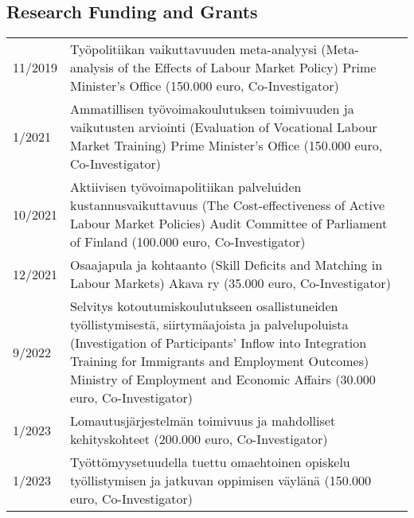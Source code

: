 \documentclass[16pt]{article}
\begin{document}
\subsection*{Research Funding and Grants}

\begin{tabular}{@{}p{1.5in}p{5in}}
11/2019  & Ty\"{o}politiikan vaikuttavuuden meta-analyysi (Meta-analysis of the Effects of Labour Market Policy) Prime Minister's Office (150.000 euro, Co-Investigator) \\
1/2021    & Ammatillisen ty\"{o}voimakoulutuksen toimivuuden ja vaikutusten arviointi (Evaluation of Vocational Labour Market Training) Prime Minister's Office (150.000 euro, Co-Investigator) \\
10/2021  & Aktiivisen työvoimapolitiikan palveluiden kustannusvaikuttavuus (The Cost-effectiveness of Active Labour Market Policies) Audit Committee of Parliament of Finland (100.000 euro, Co-Investigator)\\
12/2021   & Osaajapula ja kohtaanto (Skill Deficits and Matching in Labour Markets) Akava ry (35.000 euro, Co-Investigator)\\
9/2022   & Selvitys kotoutumiskoulutukseen osallistuneiden työllistymisestä, siirtymäajoista ja palvelupoluista (Investigation of Participants' Inflow into Integration Training for Immigrants and Employment Outcomes) Ministry of Employment and Economic Affairs (30.000 euro, Co-Investigator) \\
1/2023  & Lomautusjärjestelmän toimivuus ja mahdolliset kehityskohteet (200.000 euro, Co-Investigator) \\
1/2023  & Työttömyysetuudella tuettu omaehtoinen opiskelu työllistymisen ja jatkuvan oppimisen väylänä (150.000 euro, Co-Investigator)
\end{tabular}
\end{document}
